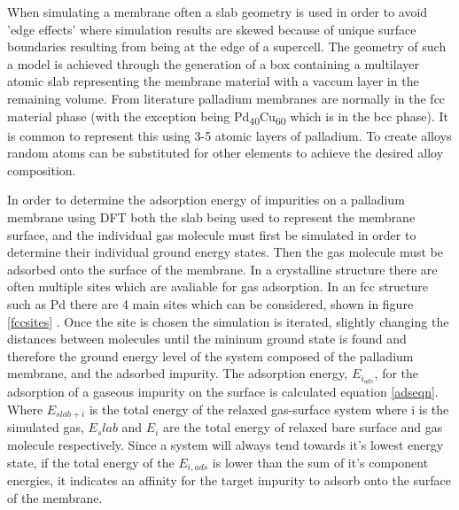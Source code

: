 When simulating a membrane often a slab geometry is used in order to avoid 'edge effects' where simulation results are skewed because of unique surface boundaries resulting from being at the edge of a supercell. The geometry of such a model is achieved through the generation of a box containing a multilayer atomic slab representing the membrane material with a vaccum layer in the remaining volume. From literature palladium membranes are normally in the fcc material phase \cite{Alique_2018} (with the exception being Pd\textsubscript{40}Cu\textsubscript{60} which is in the bcc phase). It is common to represent this using 3-5 atomic layers of palladium. To create alloys random atoms can be substituted for other elements to achieve the desired alloy composition. 

In order to determine the adsorption energy of impurities on a palladium membrane using DFT both the slab being used to represent the membrane surface, and the individual gas molecule must first be simulated in order to determine their individual ground energy states. Then the gas molecule must be adsorbed onto the surface of the membrane. In a crystalline structure there are often multiple sites which are avaliable for gas adsorption. In an fcc structure such as Pd there are 4 main sites which can be considered, shown in figure \ref{fccsites} \cite{Zeng2009}. Once the site is chosen the simulation is iterated, slightly changing the distances between molecules until the mininum ground state is found and therefore the ground energy level of the system composed of the palladium membrane, and the adsorbed impurity. The adsorption energy, $E_{i_{ads}}$, for the adsorption of a gaseous impurity on the surface is calculated equation \ref{adseqn}. Where $E_{slab + i}$ is the total energy of the relaxed gas-surface system where i is the simulated gas, $E_slab$ and $E_i$ are the total energy of relaxed bare surface and gas molecule respectively. Since a system will always tend towards it's lowest energy state, if the total energy of the $E_{i,ads}$ is lower than the sum of it's component energies, it indicates an affinity for the target impurity to adsorb onto the surface of the membrane.

